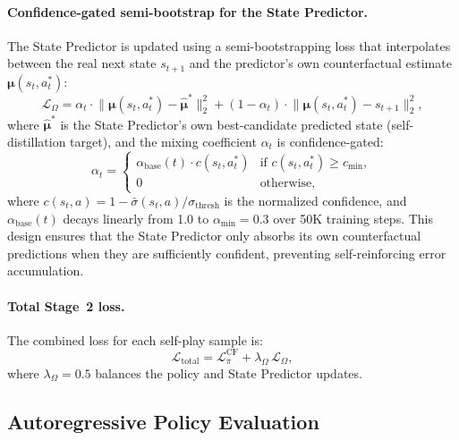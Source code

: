 \paragraph{Confidence-gated semi-bootstrap for the State Predictor.} The State Predictor is updated using a semi-bootstrapping loss that interpolates between the real next state $s_{t+1}$ and the predictor's own counterfactual estimate $\boldsymbol{\mu}(s_t, a_t^*)$:
\begin{equation}
    \mathcal{L}_{\Omega} = \alpha_t \cdot \bigl\|\boldsymbol{\mu}(s_t, a_t^*) - \hat{\boldsymbol{\mu}}^*\bigr\|_2^2 + (1 - \alpha_t) \cdot \bigl\|\boldsymbol{\mu}(s_t, a_t^*) - s_{t+1}\bigr\|_2^2,
\end{equation}
where $\hat{\boldsymbol{\mu}}^*$ is the State Predictor's own best-candidate predicted state (self-distillation target), and the mixing coefficient $\alpha_t$ is confidence-gated:
\begin{equation}
    \alpha_t = \begin{cases}
        \alpha_{\text{base}}(t) \cdot c(s_t, a_t^*) & \text{if } c(s_t, a_t^*) \geq c_{\min}, \\
        0 & \text{otherwise},
    \end{cases}
\end{equation}
where $c(s_t, a) = 1 - \bar{\sigma}(s_t, a) / \sigma_{\text{thresh}}$ is the normalized confidence, and $\alpha_{\text{base}}(t)$ decays linearly from 1.0 to $\alpha_{\min} = 0.3$ over 50K training steps. This design ensures that the State Predictor only absorbs its own counterfactual predictions when they are sufficiently confident, preventing self-reinforcing error accumulation.

\paragraph{Total Stage~2 loss.} The combined loss for each self-play sample is:
\begin{equation}
    \mathcal{L}_{\text{total}} = \mathcal{L}_{\pi}^{\text{CF}} + \lambda_{\Omega}\,\mathcal{L}_{\Omega},
\end{equation}
where $\lambda_{\Omega} = 0.5$ balances the policy and State Predictor updates.

\subsection{Autoregressive Policy Evaluation}
\label{sec:rollout}

